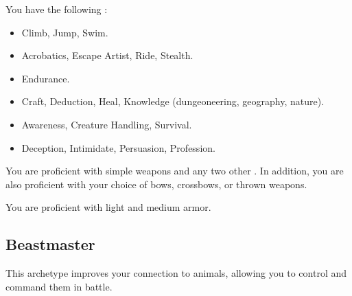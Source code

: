         You have the following :
        \begin{itemize}
            \item {} Climb, Jump, Swim.
            \item {} Acrobatics, Escape Artist, Ride, Stealth.
            \item {} Endurance.
            \item {} Craft, Deduction, Heal, Knowledge (dungeoneering, geography, nature).
            \item {} Awareness, Creature Handling, Survival.
            \item {} Deception, Intimidate, Persuasion, Profession.
        \end{itemize}

        You are proficient with simple weapons and any two other .
        In addition, you are also proficient with your choice of bows, crossbows, or thrown weapons.

        You are proficient with light and medium armor.

    \subsection{Beastmaster}
        This archetype improves your connection to animals, allowing you to control and command them in battle.

